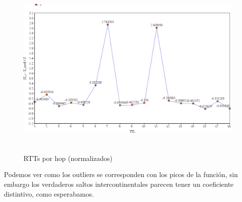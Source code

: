 \documentclass[a4paper,10pt]{article}
\begin{document}
\medskip
\begin{figure}[H]
    \centering
    \includegraphics[height=9cm]{imagenes/uCHileZ.png}
    \caption{RTTs por hop (normalizados)}
\end{figure}

\medskip
\par{Podemos ver como los outliers se corresponden con los picos de la función, sin embargo los verdaderos saltos intercontinentales parecen tener un coeficiente distintivo, como esperabamos.}



\medskip
\medskip
\medskip
\end{document}
